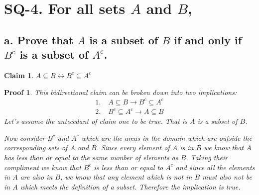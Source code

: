 \documentclass{article}
\newtheorem*{claim}{Claim}
\newtheorem*{poof}{Proof}
\begin{document}
\section*{SQ-4. For all sets $A$ and $B$,}
\subsection*{a. Prove that $A$ is a subset of $B$ if and only if $B^c$ is a subset of $A^c$.}
\begin{claim}
    $A \subseteq B \leftrightarrow B^c \subseteq A^c$
\end{claim}
\begin{poof}
    This bidirectional claim can be broken down into two implications:
    \begin{align*}
        1.&\;A\subseteq B \rightarrow B^c\subseteq A^c\\
        2.&\;B^c\subseteq A^c \rightarrow A\subseteq B
    \end{align*}
    Let's assume the antecedant of claim one to be true. That is $A$ is a subset of $B$.
    \begin{figure}[H]
    \centering
    \end{figure}
    Now consider $B^c$ and $A^c$ which are the areas in the domain which are outside the corresponding sets of $A$ and $B$. Since every element of $A$ is in $B$ we know that $A$ has less than or equal to the same number of elements as $B$. Taking their compliment we know that $B^c$ is less than or equal to $A^c$ and since all the elements in $A$ are also in $B$, we know that any element which is not in $B$ must also not be in $A$ which meets the definition of a subset. Therefore the implication is true.


\end{poof}
\end{document}
